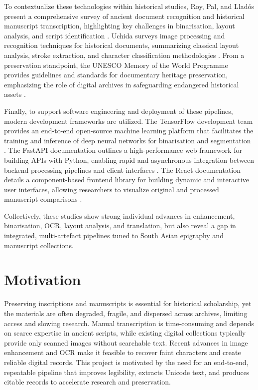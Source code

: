 To contextualize these technologies within historical studies, Roy, Pal, and Llad{\'o}s present a comprehensive survey of ancient document recognition and historical manuscript transcription, highlighting key challenges in binarisation, layout analysis, and script identification \cite{Roy2020}. Uchida surveys image processing and recognition techniques for historical documents, summarizing classical layout analysis, stroke extraction, and character classification methodologies \cite{Uchida2013}. From a preservation standpoint, the UNESCO Memory of the World Programme provides guidelines and standards for documentary heritage preservation, emphasizing the role of digital archives in safeguarding endangered historical assets \cite{UNESCO2023}.

Finally, to support software engineering and deployment of these pipelines, modern development frameworks are utilized. The TensorFlow development team provides an end-to-end open-source machine learning platform that facilitates the training and inference of deep neural networks for binarisation and segmentation \cite{TensorFlow2024}. The FastAPI documentation outlines a high-performance web framework for building APIs with Python, enabling rapid and asynchronous integration between backend processing pipelines and client interfaces \cite{FastAPI2024}. The React documentation details a component-based frontend library for building dynamic and interactive user interfaces, allowing researchers to visualize original and processed manuscript comparisons \cite{React2024}.

Collectively, these studies show strong individual advances in enhancement, binarisation, OCR, layout analysis, and translation, but also reveal a gap in integrated, multi-artefact pipelines tuned to South Asian epigraphy and manuscript collections.

\section[Motivation]{Motivation}
Preserving inscriptions and manuscripts is essential for historical scholarship, yet the materials are often degraded, fragile, and dispersed across archives, limiting access and slowing research. Manual transcription is time-consuming and depends on scarce expertise in ancient scripts, while existing digital collections typically provide only scanned images without searchable text. Recent advances in image enhancement and OCR make it feasible to recover faint characters and create reliable digital records. This project is motivated by the need for an end-to-end, repeatable pipeline that improves legibility, extracts Unicode text, and produces citable records to accelerate research and preservation.

